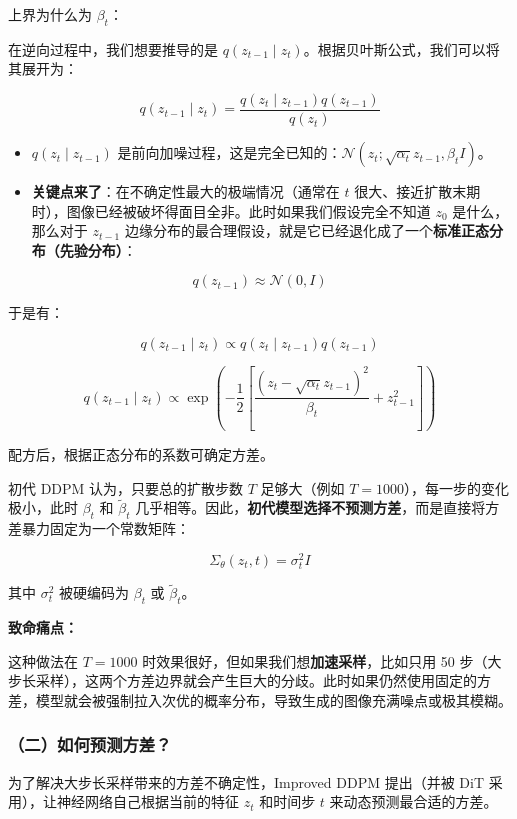 上界为什么为 \(\beta_t\)：

在逆向过程中，我们想要推导的是 \(q(z_{t-1}\mid z_t)\)。根据贝叶斯公式，我们可以将其展开为：

\[
q(z_{t-1}\mid z_t)=\frac{q(z_t\mid z_{t-1})q(z_{t-1})}{q(z_t)}
\]

\begin{itemize}
\tightlist
\item
  \(q(z_t\mid z_{t-1})\) 是前向加噪过程，这是完全已知的：\(\mathcal{N}(z_t;\sqrt{\alpha_t}z_{t-1},\beta_t I)\)。
\item
  \textbf{关键点来了}：在不确定性最大的极端情况（通常在 \(t\) 很大、接近扩散末期时），图像已经被破坏得面目全非。此时如果我们假设完全不知道 \(z_0\) 是什么，那么对于 \(z_{t-1}\) 边缘分布的最合理假设，就是它已经退化成了一个\textbf{标准正态分布（先验分布）}：
\end{itemize}

\[
q(z_{t-1})\approx\mathcal{N}(0,I)
\]

于是有：

\[
q(z_{t-1}\mid z_t)\propto q(z_t\mid z_{t-1})q(z_{t-1})
\]

\[
q(z_{t-1}\mid z_t)\propto \exp\left(-\frac{1}{2}\left[\frac{(z_t-\sqrt{\alpha_t}z_{t-1})^2}{\beta_t}+z_{t-1}^2\right]\right)
\]

配方后，根据正态分布的系数可确定方差。

初代 DDPM 认为，只要总的扩散步数 \(T\) 足够大（例如 \(T=1000\)），每一步的变化极小，此时 \(\beta_t\) 和 \(\tilde{\beta}_t\) 几乎相等。因此，\textbf{初代模型选择不预测方差}，而是直接将方差暴力固定为一个常数矩阵：

\[
\Sigma_\theta(z_t,t)=\sigma_t^2 I
\]

其中 \(\sigma_t^2\) 被硬编码为 \(\beta_t\) 或 \(\tilde{\beta}_t\)。

\textbf{致命痛点：}

这种做法在 \(T=1000\) 时效果很好，但如果我们想\textbf{加速采样}，比如只用 50 步（大步长采样），这两个方差边界就会产生巨大的分歧。此时如果仍然使用固定的方差，模型就会被强制拉入次优的概率分布，导致生成的图像充满噪点或极其模糊。

\hypertarget{ux4e8cux5982ux4f55ux9884ux6d4bux65b9ux5dee}{%
\subsubsection{（二）如何预测方差？}\label{ux4e8cux5982ux4f55ux9884ux6d4bux65b9ux5dee}}

为了解决大步长采样带来的方差不确定性，Improved DDPM 提出（并被 DiT 采用），让神经网络自己根据当前的特征 \(z_t\) 和时间步 \(t\) 来动态预测最合适的方差。

